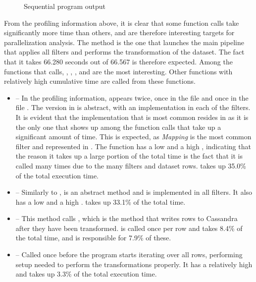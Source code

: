 \begin{figure}[ht]
  
  \caption{Sequential program  output}
  \label{fig:sequential_profiler}
\end{figure}

From the profiling information above, it is clear that some function calls take significantly more time than others, and are therefore
interesting targets for parallelization analysis. The  method is the one that launches the main pipeline that applies all
filters and performs the transformation of the dataset. The fact that it takes 66.280 seconds out of 66.567 is therefore expected. Among
the functions that  calls, , , , and  are the most
interesting. Other functions with relatively high cumulative time are called from these functions.
\begin{itemize}
  \item {} -- In the profiling information,  appears twice, once in the file  and once in the file
    . The version in  is abstract, with an implementation in each of the filters. It is evident that the implementation
    that is most common resides in  as it is the only one that shows up among the function calls that take up a significant amount of time.
    This is expected, as \textit{Mapping} is the most common filter and represented in . The function has a low  and a high
    , indicating that the reason it takes up a large portion of the total time is the fact that it is called many times due to the many filters
    and dataset rows.  takes up 35.0\% of the total execution time.
  \item {} -- Similarly to ,  is an abstract method and is implemented in all filters.
    It also has a low  and a high .  takes up 33.1\% of the total time.
  \item {} -- This method calls , which is the method that writes rows to Cassandra after they have been transformed.
     is called once per row and takes 8.4\% of the total time, and  is responsible for 7.9\% of these. 
  \item {} -- Called once before the program starts iterating over all rows, performing setup needed to perform the transformations properly.
    It has a relatively high  and takes up 3.3\% of the total execution time.
\end{itemize}
